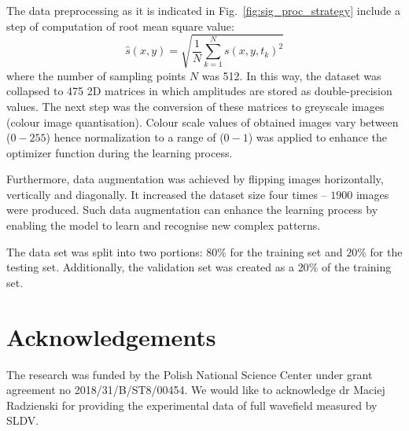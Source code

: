 \documentclass[preprint,9pt]{elsarticle}
\begin{document}
The data preprocessing as it is indicated in Fig.~\ref{fig:sig_proc_strategy} include a step of computation of root mean square value:
\begin{equation}
	\hat{s}(x,y) = \sqrt{\frac{1}{N}\sum_{k=1}^{N} s(x,y,t_k)^2}
	\label{eq:rms}
\end{equation}
where the number of sampling points \(N\) was 512.
In this way, the dataset was collapsed to 475 2D matrices in which amplitudes are stored as double-precision values.
The next step was the conversion of these matrices to greyscale images (colour image quantisation).
Colour scale values of obtained images vary between (\(0 - 255\)) hence normalization
to a range of (\(0-1\)) was applied to enhance the optimizer function during the learning process. 
	
Furthermore, data augmentation was achieved by flipping images horizontally, vertically and diagonally. 
It increased the dataset size four times -- \(1900\) images were produced.
Such data augmentation can enhance the learning process by enabling the model to learn and recognise new complex patterns.
	
The data set was split into two portions:  \(80\%\) for the training set and \(20\%\) for the testing set.
Additionally, the validation set was created as a \(20\%\) of the training set.




\clearpage	
\section*{Acknowledgements}
The research was funded by the Polish National Science Center under grant agreement no 2018/31/B/ST8/00454.
We would like to acknowledge dr Maciej Radzienski for providing the experimental data of full wavefield measured by SLDV.



\end{document}
